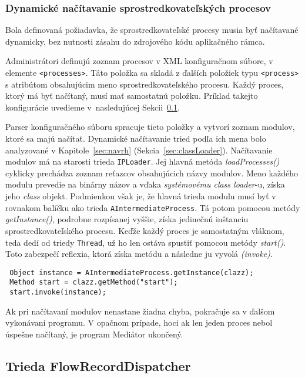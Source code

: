 \subsubsection{Dynamické načítavanie sprostredkovateľských procesov} \label{sec:intermediate_load}

Bola definovaná požiadavka, že sprostredkovateľské procesy musia byť načítavané dynamicky, bez nutnosti
zásahu do zdrojového kódu aplikačného rámca. 

Administrátori definujú zoznam procesov v XML konfiguračnom súbore, v elemente \verb|<processes>|. 
Táto položka sa skladá z ďalších položiek typu \verb|<process>| s atribútom 
obsahujúcim meno sprostredkovateľského procesu. Každý proces, ktorý má byť načítaný, musí mať 
samostatnú položku. Príklad takejto konfigurácie uvedieme v~nasledujúcej 
Sekcii~\ref{sec:FlowRecordDispatcher}.

Parser konfiguračného súboru spracuje tieto položky a vytvorí zoznam modulov, ktoré sa majú načítať.
Dynamické načítavanie tried podľa ich mena bolo analyzované v Kapitole~\ref{sec:navrh} 
(Sekcia~\ref{sec:classLoader}). Načítavanie modulov má na starosti trieda \verb|IPLoader|. Jej hlavná 
metóda
\emph{loadProcesses()} cyklicky prechádza zoznam reťazcov obsahujúcich názvy modulov. Meno každého 
modulu prevedie na binárny názov a vďaka \emph{systémovému class loader}-u, získa jeho 
\emph{class} objekt. Podmienkou však je, že hlavná trieda modulu musí byť v rovnakom balíčku ako trieda
\verb|AIntermediateProcess|. Tá potom pomocou metódy \emph{getInstance()}, podrobne rozpísanej vyššie, 
získa jedinečnú inštanciu sprostredkovateľského procesu. Keďže každý proces je samostatným vláknom, teda 
dedí od triedy \verb|Thread|, už ho len ostáva spustiť pomocou metódy \emph{start()}. Toto zabezpečí 
reflexia, ktorá získa metódu a následne ju vyvolá \emph{(invoke)}.
\begin{verbatim}
 Object instance = AIntermediateProcess.getInstance(clazz);
 Method start = clazz.getMethod("start");
 start.invoke(instance);
\end{verbatim}

Ak pri načítavaní modulov nenastane žiadna chyba, pokračuje sa v ďalšom vykonávaní programu. V opačnom 
prípade, hoci ak len jeden proces nebol úspešne načítaný, je program Mediátor ukončený.




\subsection{Trieda FlowRecordDispatcher} \label{sec:FlowRecordDispatcher}

